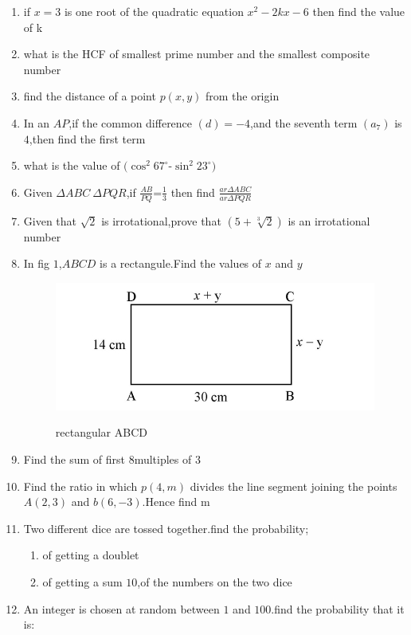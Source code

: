 \documentclass{article}
\begin{document}
\begin{enumerate}
\item if $x=3$ is one root of the quadratic equation $x^2-2kx-6$ then find the value of k
\item what is the HCF of smallest prime number and the smallest composite number
\item find the distance of a point $p(x,y)$ from the origin
\item In an $AP$,if the common difference $(d)=-4$,and the seventh term $(a_{7})$ is $4$,then find the first term
\item what is the value of $(\cos^2{67^\circ}$-$\sin^2{23^\circ})$
\item Given $\Delta ABC ~ \Delta PQR$,if $\frac{AB}{PQ}$=$\frac{1}{3}$ then find $\frac {ar \Delta ABC}{ar \Delta PQR}$
\item Given that $\sqrt{2}$ is irrotational,prove that $(5+\sqrt[3]{2})$ is an irrotational number
\item In fig $1$,$ABCD$ is a rectangule.Find the values of $x$ and $y$\\
	\begin{figure}[H]
		\centering
		\includegraphics [width=\columnwidth] {./IMG1.jpg}
		\label{fig:fig1}
		\caption{rectangular ABCD}
	\end{figure}
\item Find the sum of first $8$multiples of $3$
\item Find the ratio in which $p(4,m)$ divides the line segment joining the points $A(2,3)$ and $b(6,-3)$.Hence find m
\item Two different dice are tossed together.find the probability;
	\begin{enumerate}[label=\roman*)]
		\item of getting a doublet
		\item of getting a sum $10$,of the numbers on the two dice
	\end{enumerate}
\item An integer is chosen at random between $1$ and $100$.find the probability that it is:

\end{enumerate}
\end{document}
